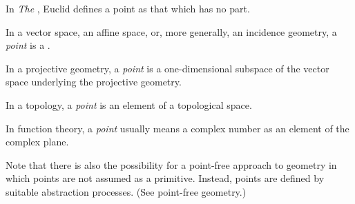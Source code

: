 \documentclass[12pt]{article}
\begin{document}
In {\sl The \/}, Euclid defines a point as that which has no part.

In a vector space, an affine space, or, more generally, an incidence geometry, a {\sl point\/} is a   .

In a projective geometry, a {\sl point\/} is a one-dimensional subspace of the vector space underlying the projective geometry.

In a topology, a {\sl point\/} is an element of a topological space.

In function theory, a {\sl point\/} usually means a complex number as an element of the complex plane.

Note that there is also the possibility for a point-free approach to geometry in which points are not assumed as a primitive. Instead, points are defined by suitable abstraction processes.  (See point-free geometry.)



\end{document}

